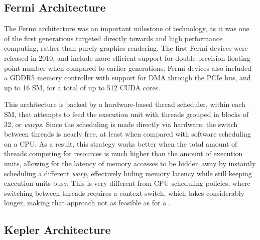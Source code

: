 \documentclass[main.tex]{subfiles}
\begin{document}

\subsection{Fermi Architecture}

The Fermi architecture was an important milestone of \gpus technology, as it was one of the first generations targeted directly towards \gpgpu and high performance computing, rather than purely graphics rendering. The first Fermi devices were released in 2010, and include more efficient support for double precision floating point number when compared to earlier generations. Fermi devices also included a GDDR5 memory controller with support for \ac{DMA} through the \acs{PCIe} bus, and up to 16 \acf{SM}, for a total of up to 512 \acs{CUDA} cores.


This architecture is backed by a hardware-based thread scheduler, within each \acs{SM}, that attempts to feed the execution unit with threads grouped in blocks of 32, or \textit{warps}. Since the scheduling is made directly via hardware, the switch between threads is nearly free, at least when compared with software scheduling on a \acs{CPU}. As a result, this strategy works better when the total amount of threads competing for resources is much higher than the amount of execution units, allowing for the latency of memory accesses to be hidden away by instantly scheduling a different \textit{warp}, effectively hiding memory latency while still keeping execution units busy. This is very different from \acs{CPU} scheduling policies, where switching between threads requires a context switch, which takes considerably longer, making that approach not as feasible as for a \gpu.




\subsection{Kepler Architecture}
\end{document}
